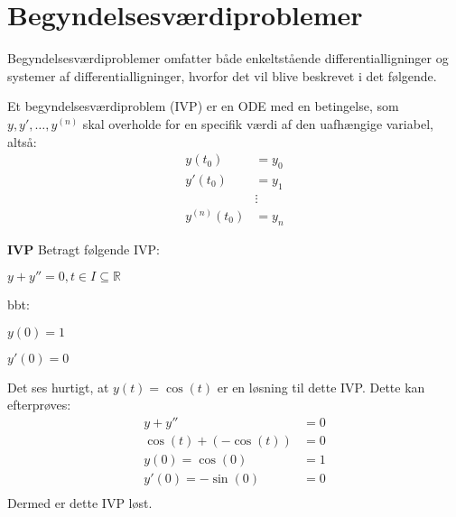 
\section{Begyndelsesværdiproblemer}
Begyndelsesværdiproblemer omfatter både enkeltstående differentialligninger og systemer af differentialligninger, hvorfor det vil blive beskrevet i det følgende.
\begin{definition}
Et begyndelsesværdiproblem (IVP) er en ODE med en betingelse, som $y, y',\hdots, y^{(n)}$ skal overholde for en specifik værdi af den uafhængige variabel, altså:
\begin{align*}
    y(t_0) &= y_0 \\
    y'(t_0) &= y_1 \\
    &\vdots \\
    y^{(n)}(t_0) &= y_n
\end{align*}
\end{definition}

\begin{Example}\textbf{IVP}\hfill \break
\textnormal{Betragt følgende IVP:}\hfill \break
\centerline{$y+y''=0, t \in I \subseteq \mathbb{R}$}
\centerline{bbt:}
\centerline{$y(0)=1$}
\centerline{$y'(0)=0$} \hfill \break
\textnormal{Det ses hurtigt, at $y(t)=\cos(t)$ er en løsning til dette IVP. Dette kan efterprøves:}
\begin{align*}
    y+y''&=0 \\
    \cos(t)+(-\cos(t))&=0 \\
    y(0)=\cos(0)&=1\\
    y'(0)=-\sin(0)&=0\\ 
\end{align*}
\textnormal{Dermed er dette IVP løst.}
\end{Example}

